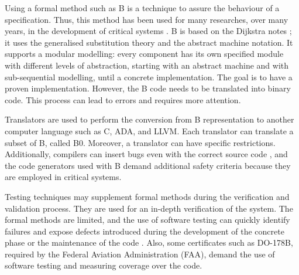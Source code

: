 \documentclass[runningheads]{llncs}
\begin{document}
Using a formal method such as B is a technique to assure the behaviour of a specification.
Thus, this method has been used for many researches, over many years, in the development of critical systems \cite{valerio_thesis:2016}. B is based on the Dijkstra notes \cite{dijkstra1976discipline}; it uses the generalised substitution theory \cite{hoare2002proof} and the abstract machine notation. It supports a modular modelling:  every component has its own specified module with different levels of abstraction, starting with an abstract machine and with sub-sequential modelling, until a concrete implementation. The goal is to have a proven implementation. However, the B code needs to be translated into binary code. This process can lead to errors and requires more attention. 

Translators are used to perform the conversion from B representation to another computer language such as C, ADA, and LLVM. Each translator can translate a subset of B, called B0. Moreover, a translator can have specific restrictions. %
Additionally, compilers can insert bugs even with the correct source code \cite{leroy2009formal}, and the code generators used with B demand additional safety criteria because they are employed in critical systems.

Testing techniques may supplement formal methods during the verification and validation process. They are used for an in-depth verification of the system. The formal methods are limited, and the use of software testing can quickly identify failures and expose defects introduced during the development of the concrete phase or the maintenance of the code \cite{ernesto_thesis:2016}. Also, some certificates such as DO-178B, required by the Federal Aviation Administration (FAA), demand the use of software testing and measuring coverage over the code.
\end{document}
